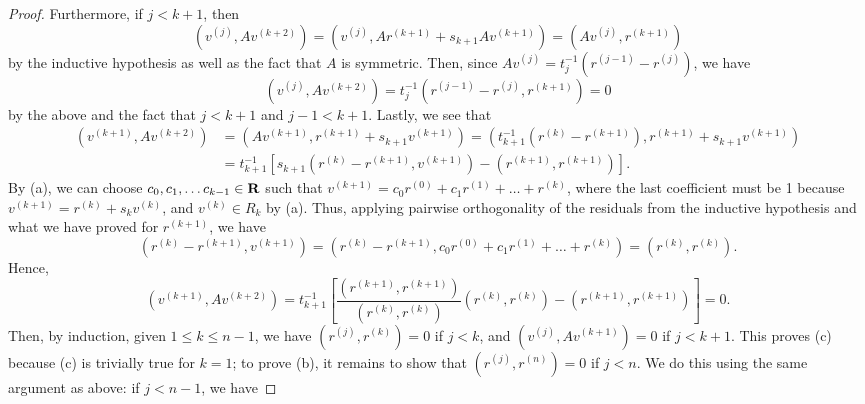 \documentclass{homework}
\newcommand{\pow}[1]{^{\left(#1\right)}}
\begin{document}
\begin{proof}
		Furthermore, if $j< k+1$, then
		\begin{equation*}
			\left(v\pow{j}, Av\pow{k+2}\right) = \left(v\pow{j}, Ar\pow{k+1}+ s_{k+1}Av\pow{k+1}\right) = \left(Av\pow{j}, r\pow{k+1}\right)
		\end{equation*}
		by the inductive hypothesis as well as the fact that $A$ is symmetric. Then, since $Av\pow{j} = t_j^{-1}\left(r\pow{j-1} - r\pow{j}\right)$, we have
		\begin{equation*}
			\left(v\pow{j}, Av\pow{k+2}\right) = t_j^{-1}\left(r\pow{j-1}- r\pow{j},r\pow{k+1}\right) = 0
		\end{equation*}
		by the above and the fact that $j < k+1$ and $j-1<k+1$. Lastly, we see that
		\begin{equation*}
		\begin{aligned}
			\left(v\pow{k+1}, Av\pow{k+2}\right) &= \left(Av\pow{k+1}, r\pow{k+1} + s_{k+1}v\pow{k+1}\right) = \left(t_{k+1}^{-1}\left(r\pow{k} - r\pow{k+1}\right), r\pow{k+1} + s_{k+1}v\pow{k+1}\right) \\
			&= t_{k+1}^{-1}\left[s_{k+1}\left(r\pow{k} - r\pow{k+1}, v\pow{k+1}\right) - \left(r\pow{k+1}, r\pow{k+1}\right)\right].
		\end{aligned}
		\end{equation*}
		By (a), we can choose $c_0, c_1, \dots c_{k-1}\in \textbf{R}$ such that $v\pow{k+1} = c_0r\pow{0} + c_1r\pow{1} + \dots + r\pow{k}$, where the last coefficient must be 1 because $v\pow{k+1} = r\pow{k} + s_kv\pow{k}$, and $v\pow{k} \in R_k$ by (a). Thus, applying pairwise orthogonality of the residuals from the inductive hypothesis and what we have proved for $r\pow{k+1}$, we have
		\begin{equation*}
			\left(r\pow{k} - r\pow{k+1}, v\pow{k+1}\right) = \left(r\pow{k} - r\pow{k+1}, c_0r\pow{0} + c_1r\pow{1} + \dots + r\pow{k}\right) = \left(r\pow{k}, r\pow{k}\right).
		\end{equation*}
		Hence,
		\begin{equation*}
			\left(v\pow{k+1}, Av\pow{k+2}\right) = t_{k+1}^{-1}\left[\frac{\left(r\pow{k+1}, r\pow{k+1}\right)}{\left(r\pow{k}, r\pow{k}\right)}\left(r\pow{k}, r\pow{k}\right) - \left(r\pow{k+1}, r\pow{k+1}\right)\right] = 0.
		\end{equation*}
		Then, by induction, given $1 \le k \le n-1$, we have $\left(r\pow{j}, r\pow{k}\right) = 0$ if $j < k$, and $\left(v\pow{j}, Av\pow{k+1}\right) =0$ if $j < k+1$. This proves (c) because (c) is trivially true for $k=1$; to prove (b), it remains to show that $\left(r\pow{j}, r\pow{n}\right) = 0$ if $j < n$. We do this using the same argument as above: if $j < n-1$, we have

\end{proof}
\end{document}
